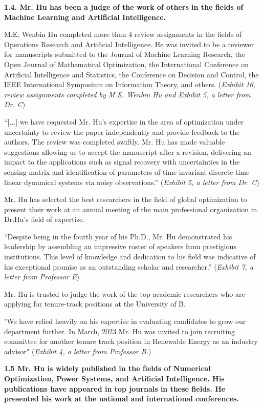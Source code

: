 \documentclass{article}
\begin{document}
{\bf 1.4. Mr. Hu has been a judge of the work of others in the fields of Machine Learning and Artificial Intelligence. }

M.E. Wenbin Hu completed more than 4 review assignments in the fields of Operations Research and Artificial Intelligence. He was invited to be a reviewer for manuscripts submitted to the Journal of Machine Learning Research, the Open Journal of Mathematical Optimization, the International Conference on Artificial Intelligence and Statistics, the Conference on Decision and Control, the IEEE International Symposium on Information Theory, and others. ({\it Exhibit 16, review assignments completed by M.E. Wenbin Hu and Exhibit 5, a letter from Dr. C})

“[...] we have requested Mr. Hu’s expertise in the area of optimization under uncertainty to review the paper independently and provide feedback to the authors. The review was completed swiftly. Mr. Hu has made valuable suggestions allowing us to accept the manuscript after a revision, delivering an impact to the applications such as signal recovery with uncertainties in the sensing matrix and identification of parameters of time-invariant discrete-time linear dynamical systems via noisy observations.” ({\it Exhibit 5, a letter from Dr. C}) 

Mr. Hu has selected the best researchers in the field of global optimization to present their work at an annual meeting of the main professional organization in Dr.Hu's field of expertise.

“Despite being in the fourth year of his Ph.D., Mr. Hu demonstrated his leadership by assembling an impressive roster of speakers from prestigious institutions. This level of knowledge and dedication to his field was indicative of his exceptional promise as an outstanding scholar and researcher.” ({\it Exhibit 7, a letter from Professor E}) 

Mr. Hu is trusted to judge the work of the top academic researchers who are applying for tenure-track positions at the University of B.

"We have relied heavily on his expertise in evaluating candidates to grow our department further. In March, 2023 Mr. Hu was invited to join recruiting committee for another tenure track position in Renewable Energy as an industry advisor" ({\it Exhibit 4, a letter from Professor B.}) 

{\bf 1.5 Mr. Hu is widely published in the fields of Numerical Optimization, Power Systems, and Artificial Intelligence. His publications have appeared in top journals in these fields. He presented his work at the national and international conferences.}
\end{document}
